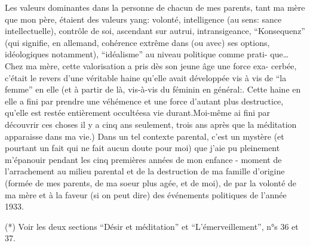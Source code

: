 Les valeurs dominantes dans la personne de chacun de mes parents, tant ma
mère que mon père, étaient des valeurs yang: volonté, intelligence (au sens: \newline
sance intellectuelle), contrôle de soi, ascendant sur autrui, intransigeance,
``Konsequenz'' (qui signifie, en allemand, cohérence extrême dans (ou avec) ses
options, idéologiques notamment), ``idéalisme'' au niveau politique comme prati-\newline
que\ldots Chez ma mère, cette valorisation a pris dès son jeune âge une force exa-\newline
cerbée, c'était le revers d'une véritable haine qu'elle avait développée vis à
vis de ``la femme'' en elle (et à partir de là, vis-à-vis du féminin en général:\inserted{)}.
Cette haine en elle a fini par prendre une véhémence et une force d'autant plus
destructice, qu'elle est restée entièrement occultéesa vie durant.\inserted{(}Moi-même ai
fini par découvrir ces choses il y a cinq ans seulement, trois ans après que la
méditation apparaisse dans ma vie.) Dans un tel contexte parental, c'est un
mystère (et pourtant un fait qui ne fait aucun doute pour moi) que j'aie pu
pleinement m'épanouir pendant les cinq premières années de mon enfance - 
moment de l'arrachement au milieu parental et de la destruction de ma famille
d'origine (formée de mes parents, de ma soeur plus agée, et de moi), de par la
volonté de ma mère et à la faveur (si on peut dire) des événements politiques de
l'année 1933.

(*) Voir les deux sections ``Désir et méditation'' et ``L'émerveillement'', n°s 36
et 37.

